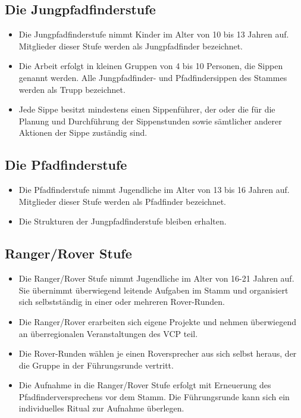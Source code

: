 \documentclass[a4paper]{article}
\begin{document}
    \subsection{Die Jungpfadfinderstufe} %
    \label{sub:die_jungpfadfinderstufe}
    \begin{itemize}
        \item Die Jungpfadfinderstufe nimmt Kinder im Alter von 10 bis 13 Jahren auf. Mitglieder dieser
Stufe werden als Jungpfadfinder bezeichnet.
        \item Die Arbeit erfolgt in kleinen Gruppen von 4 bis 10 Personen, die Sippen genannt werden. Alle
Jungpfadfinder- und Pfadfindersippen des Stammes werden als Trupp bezeichnet.
        \item Jede Sippe besitzt mindestens einen Sippenführer, der oder die für die Planung und Durchführung der
Sippenstunden sowie sämtlicher anderer Aktionen der Sippe zuständig sind.
    \end{itemize}
    
    \subsection{Die Pfadfinderstufe} %
    \label{ssub:die_pfadfinderstufe}
    \begin{itemize}
        \item Die Pfadfinderstufe nimmt Jugendliche im Alter von 13 bis 16 Jahren auf. Mitglieder dieser
Stufe werden als Pfadfinder bezeichnet.
        \item Die Strukturen der Jungpfadfinderstufe bleiben erhalten.
    \end{itemize}

    \subsection{Ranger/Rover Stufe} %
    \label{sub:ranger_rover_stufe}
        \begin{itemize}
            \item Die Ranger/Rover Stufe nimmt Jugendliche im Alter von 16-21 Jahren auf. Sie übernimmt überwiegend leitende Aufgaben im Stamm und organisiert sich selbstständig in einer oder mehreren Rover-Runden. 
            \item Die Ranger/Rover erarbeiten sich eigene Projekte und nehmen überwiegend an überregionalen Veranstaltungen des VCP teil. 
            \item Die Rover-Runden wählen je einen Roversprecher aus sich selbst heraus, der die Gruppe in der Führungsrunde vertritt. 
            \item Die Aufnahme in die Ranger/Rover Stufe erfolgt mit Erneuerung des Pfadfinderversprechens vor dem Stamm. Die Führungsrunde kann sich ein individuelles Ritual zur Aufnahme überlegen.
        \end{itemize}
    
\end{document}
